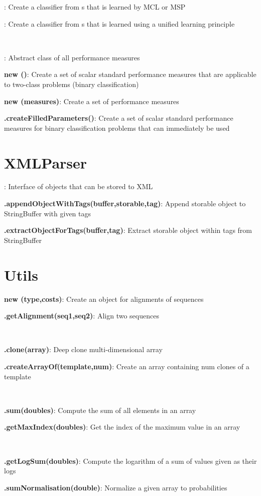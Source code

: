 \documentclass[10pt]{scrartcl}
\newcommand{\entry}[3]{{\bfseries #1#2}: #3}
\begin{document}
\begin{flushleft}
\entry{\MSPClassifier}{}{Create a classifier from \DiffSM s that is learned by MCL or MSP}

\entry{\GenDisMixClassifier}{}{Create a classifier from \DiffSM s that is learned using a unified learning principle}

~

\entry{\AbstractPerformanceMeasure}{}{Abstract class of all performance measures}

\entry{new \NumericalPerformanceMeasureParameterSet}{()}{Create a set of scalar standard performance measures that are applicable to two-class problems (binary classification)}

\entry{new \PerformanceMeasureParameterSet}{(measures)}{Create a set of performance measures}

\entry{\PerformanceMeasureParameterSet}{.createFilledParameters()}{Create a set of scalar standard performance measures for binary classification problems that can immediately be used}

\section{XMLParser}

\entry{\Storable}{}{Interface of objects that can be stored to XML}

\entry{\XMLParser}{.appendObjectWithTags(buffer,storable,tag)}{Append storable object to StringBuffer with given tags}

\entry{\XMLParser}{.extractObjectForTags(buffer,tag)}{Extract storable object within tags from StringBuffer}

\section{Utils}

\entry{new \Alignment}{(type,costs)}{Create an object for alignments of sequences}

\entry{\Alignment}{.getAlignment(seq1,seq2)}{Align two sequences}

~

\entry{\ArrayHandler}{.clone(array)}{Deep clone multi-dimensional array}

\entry{\ArrayHandler}{.createArrayOf(template,num)}{Create an array containing num clones of a template}

~

\entry{\ToolBox}{.sum(doubles)}{Compute the sum of all elements in an array}

\entry{\ToolBox}{.getMaxIndex(doubles)}{Get the index of the maximum value in an array}

~

\entry{\Normalisation}{.getLogSum(doubles)}{Compute the logarithm of a sum of values given as their logs}

\entry{\Normalisation}{.sumNormalisation(double)}{Normalize a given array to probabilities}
\end{flushleft}
\end{document}
